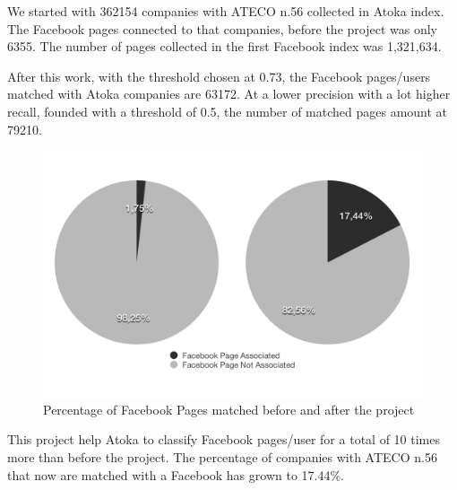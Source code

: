We started with 362154 companies with ATECO n.56 collected in Atoka index. The Facebook pages connected to that companies, before the project was only 6355. The number of pages collected in the first Facebook index was 1,321,634.

After this work, with the threshold chosen at 0.73, the Facebook pages/users matched with Atoka companies are 63172. At a lower precision with a lot higher recall, founded with a threshold of 0.5, the number of matched pages amount at 79210.

\begin{figure}
\centering
    \includegraphics[width=0.5\columnwidth]{img/confronto_bw.png}
    \caption{Percentage of Facebook Pages matched before and after the project}
    \label{Fig.6}
\end{figure}

This project help Atoka to classify Facebook pages/user for a total of 10 times more than before the project. The percentage of companies with ATECO n.56 that now are matched with a Facebook has grown to 17.44\%.

